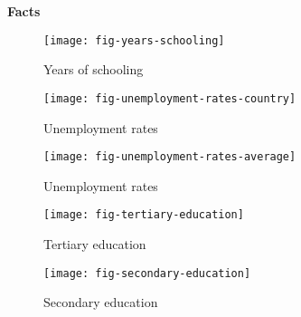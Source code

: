 \begin{frame}\begin{center}
		\LARGE\textbf{Facts}
\end{center}\end{frame}
\begin{frame}
	\begin{figure}[htp]\centering
		\caption{Years of schooling}\scalebox{0.35}
		{\texttt{[image: fig-years-schooling]}}
	\end{figure}
\end{frame}
\begin{frame}
	\begin{figure}[htp]\centering
		\caption{Unemployment rates}\scalebox{0.35}
		{\texttt{[image: fig-unemployment-rates-country]}}
	\end{figure}
\end{frame}
\begin{frame}
	\begin{figure}[htp]\centering
		\caption{Unemployment rates}\scalebox{0.35}
		{\texttt{[image: fig-unemployment-rates-average]}}
	\end{figure}
\end{frame}
\begin{frame}
	\begin{figure}[htp]\centering
		\caption{Tertiary education}\scalebox{0.35}
		{\texttt{[image: fig-tertiary-education]}}
	\end{figure}
\end{frame}
\begin{frame}
	\begin{figure}[htp]\centering
		\caption{Secondary education}\scalebox{0.35}
		{\texttt{[image: fig-secondary-education]}}
	\end{figure}
\end{frame}
